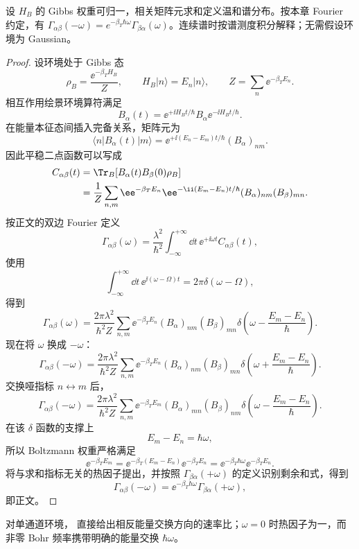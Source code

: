 \begin{proposition}
设 $H_B$ 的 Gibbs 权重可归一，相关矩阵元求和定义温和谱分布。按本章 Fourier 约定，有 $\Gamma_{\alpha\beta}(-\omega)=e^{-\beta_T\hbar\omega}\Gamma_{\beta\alpha}(\omega)$。连续谱时按谱测度积分解释；无需假设环境为 Gaussian。
\end{proposition}
\begin{proof}
设环境处于 Gibbs 态
\[
\rho_B=\frac{\ee^{-\beta_T H_B}}{Z},
\qquad
H_B|n\rangle=E_n|n\rangle,
\qquad
Z=\sum_n\ee^{-\beta_TE_n}.
\]
相互作用绘景环境算符满足
\[
B_\alpha(t)=\ee^{+\ii H_Bt/\hbar}B_\alpha\ee^{-\ii H_Bt/\hbar}.
\]
在能量本征态间插入完备关系，矩阵元为
\[
\langle n|B_\alpha(t)|m\rangle
=\ee^{+\ii(E_n-E_m)t/\hbar}(B_\alpha)_{nm}.
\]
因此平稳二点函数可以写成
\begin{align*}
C_{\alpha\beta}(t)
&=\Tr_B[B_\alpha(t)B_\beta(0)\rho_B]\\
&=\frac1Z\sum_{n,m}
\ee^{-\beta_TE_n}
\ee^{-\ii(E_m-E_n)t/\hbar}
(B_\alpha)_{nm}(B_\beta)_{mn}.
\end{align*}
按正文的双边 Fourier 定义
\[
\Gamma_{\alpha\beta}(\omega)
=\frac{\lambda^2}{\hbar^2}
\int_{-\infty}^{+\infty}\dd t\,
\ee^{+\ii\omega t}C_{\alpha\beta}(t),
\]
使用
\[
\int_{-\infty}^{+\infty}\dd t\,
\ee^{\ii(\omega-\Omega)t}=2\pi\delta(\omega-\Omega),
\]
得到
\[
\Gamma_{\alpha\beta}(\omega)
=\frac{2\pi\lambda^2}{\hbar^2Z}
\sum_{n,m}\ee^{-\beta_TE_n}
(B_\alpha)_{nm}(B_\beta)_{mn}
\delta\!\left(\omega-\frac{E_m-E_n}{\hbar}\right).
\]
现在将 $\omega$ 换成 $-\omega$：
\[
\Gamma_{\alpha\beta}(-\omega)
=\frac{2\pi\lambda^2}{\hbar^2Z}
\sum_{n,m}\ee^{-\beta_TE_n}
(B_\alpha)_{nm}(B_\beta)_{mn}
\delta\!\left(\omega+\frac{E_m-E_n}{\hbar}\right).
\]
交换哑指标 $n\leftrightarrow m$ 后，
\[
\Gamma_{\alpha\beta}(-\omega)
=\frac{2\pi\lambda^2}{\hbar^2Z}
\sum_{n,m}\ee^{-\beta_TE_m}
(B_\alpha)_{mn}(B_\beta)_{nm}
\delta\!\left(\omega-\frac{E_m-E_n}{\hbar}\right).
\]
在该 $\delta$ 函数的支撑上
\[
E_m-E_n=\hbar\omega,
\]
所以 Boltzmann 权重严格满足
\[
\ee^{-\beta_TE_m}
=\ee^{-\beta_T(E_m-E_n)}\ee^{-\beta_TE_n}
=\ee^{-\beta_T\hbar\omega}\ee^{-\beta_TE_n}.
\]
将与求和指标无关的热因子提出，并按照 $\Gamma_{\beta\alpha}(+\omega)$ 的定义识别剩余和式，得到
\[
\Gamma_{\alpha\beta}(-\omega)
=\ee^{-\beta_T\hbar\omega}
\Gamma_{\beta\alpha}(+\omega),
\]
即正文。
\end{proof}


对单通道环境， 直接给出相反能量交换方向的速率比；$\omega=0$ 时热因子为一，而非零 Bohr 频率携带明确的能量交换 $\hbar\omega$。

